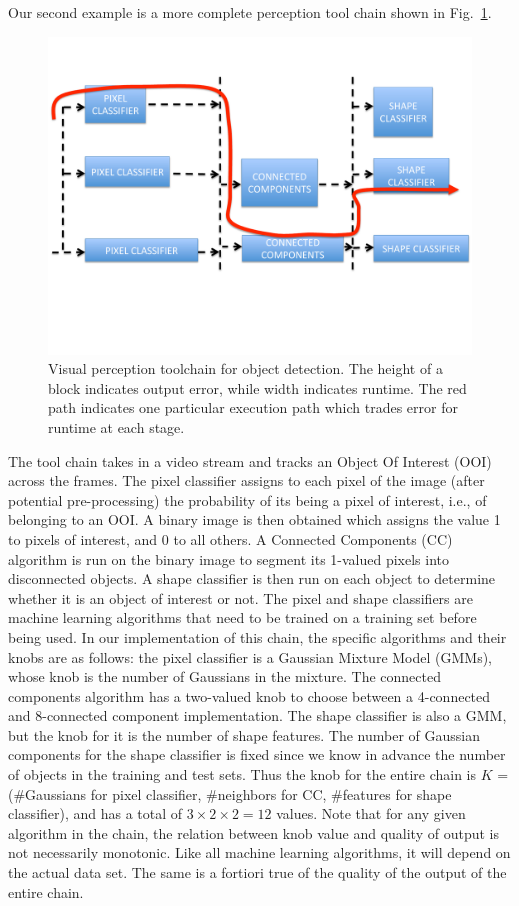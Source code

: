 Our second example is a more complete perception tool chain shown in Fig.~\ref{fig:chain}.
\begin{figure}[t]
	\centering
	\includegraphics[width=0.7\linewidth]{figures/chain}
	\caption{Visual perception toolchain for object detection. The height of a block indicates output error, while width indicates runtime. The red path indicates one particular execution path which trades error for runtime at each stage.}
	\label{fig:chain}
\end{figure}
The tool chain takes in a video stream and tracks an Object Of Interest (OOI) across the frames.
The pixel classifier assigns to each pixel of the image (after potential pre-processing) the probability of its being a pixel of interest, i.e., of belonging to an OOI. 
A binary image is then obtained which assigns the value 1 to pixels of interest, and 0 to all others. 
A Connected Components (CC) algorithm is run on the binary image to segment its 1-valued pixels into disconnected objects.
A shape classifier is then run on each object to determine whether it is an object of interest or not.
The pixel and shape classifiers are machine learning algorithms that need to be trained on a training set before being used.
In our implementation of this chain, the specific algorithms and their knobs are as follows:
the pixel classifier is a Gaussian Mixture Model (GMMs), whose knob is the number of Gaussians in the mixture.
The connected components algorithm has a two-valued knob to choose between a 4-connected and 8-connected component implementation.
The shape classifier is also a GMM, but the knob for it is the number of shape features.
The number of Gaussian components for the shape classifier is fixed since we know in advance the number of objects in the training and test sets.
Thus the knob for the entire chain is $K$ = (\#Gaussians for pixel classifier, \#neighbors for CC, \#features for shape classifier), and has a total of $3 \times 2 \times 2 = 12$ values.
Note that for any given algorithm in the chain, the relation between knob value and quality of output is not necessarily monotonic. 
Like all machine learning algorithms, it will depend on the actual data set.
The same is a fortiori true of the quality of the output of the entire chain.

